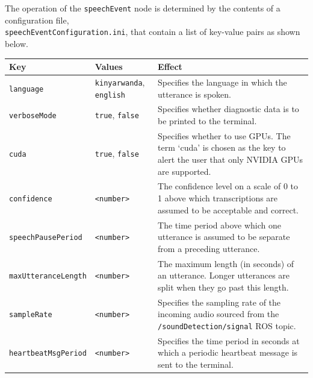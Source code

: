 \documentclass{CSSRforAfrica}
\begin{document}
{The operation of the {\small \verb+speechEvent+} node is determined by the contents of a configuration file, \\
{\small \verb+speechEventConfiguration.ini+}, that  contain a list of key-value pairs as shown below.  

\begin{center}
\begin{tabularx}{\linewidth}{| l | l | X|}
\hline 
{\small Key }                               & {\small Values }                                                 &  {\small Effect}       \\
\hline
{\footnotesize \verb+language+}  & {\footnotesize \verb+kinyarwanda+, \verb+english+}   &  {\small Specifies the language in which the utterance is spoken.} \\ 
\hline
{\footnotesize \verb+verboseMode+}  & {\footnotesize \verb+true+, \verb+false+}     & {\small Specifies whether diagnostic data is to be printed to the terminal.} \\
\hline
{\footnotesize \verb+cuda+}  & {\footnotesize \verb+true+, \verb+false+}     & {\small Specifies whether to use GPUs. The term `cuda' is chosen as the key to alert the user that only NVIDIA GPUs are supported.} \\
\hline
{\footnotesize \verb+confidence+}  & {\footnotesize \verb+<number>+}     & {\small The confidence level on a scale of 0 to 1 above which transcriptions are assumed to be acceptable and correct.} \\
\hline
{\footnotesize \verb+speechPausePeriod+}  & {\footnotesize \verb+<number>+}     & {\small The time period above which one utterance is assumed to be separate from a preceding utterance.} \\
\hline
{\footnotesize \verb+maxUtteranceLength+}  & {\footnotesize \verb+<number>+}     & {\small The maximum length (in seconds) of an utterance. Longer utterances are split when they go past this length.} \\
\hline
{\footnotesize \verb+sampleRate+}  & {\footnotesize \verb+<number>+}     & {\small Specifies the sampling rate of the incoming audio sourced from the \verb+/soundDetection/signal+ ROS topic.} \\
\hline
{\footnotesize \verb+heartbeatMsgPeriod+}  & {\footnotesize \verb+<number>+}     & {\small Specifies the time period in seconds at which a periodic heartbeat message is sent to the terminal.} \\
\hline
\end{tabularx}
\end{center}


}
\end{document}
